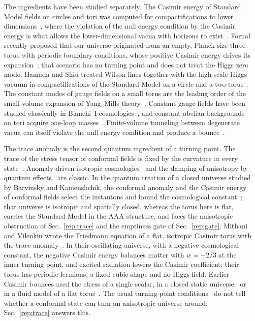 The ingredients have been studied separately.
The Casimir energy of Standard Model fields on circles and tori was computed for compactifications to lower dimensions~\cite{Arkani-Hamed:2007ryu,Fornal:2011tw}, where the violation of the null energy condition by the Casimir energy is what allows the lower-dimensional vacua with horizons to exist~\cite{Arkani-Hamed:2007ryu}.
Fornal recently proposed that our universe originated from an empty, Planck-size three-torus with periodic boundary conditions, whose positive Casimir energy drives its expansion~\cite{Fornal:2026qfq}; that scenario has no turning point and does not treat the Higgs zero mode.
Hamada and Shiu treated Wilson lines together with the high-scale Higgs vacuum in compactifications of the Standard Model on a circle and a two-torus~\cite{Hamada:2017yji}.
The constant modes of gauge fields on a small torus are the leading order of the small-volume expansion of Yang--Mills theory~\cite{Luscher:1982uv,Luscher:1982ma,Luscher:1983gm,Weisz:1986vu,vanBaal:1988va,vanBaal:2000zc}.
Constant gauge fields have been studied classically in Bianchi~I cosmologies~\cite{Darian:1996jf,Jin:2004vh}, and constant abelian backgrounds on tori acquire one-loop masses~\cite{Kirsten:1993ty,Kirsten:1993qp}.
Finite-volume tunneling between degenerate vacua can itself violate the null energy condition and produce a bounce~\cite{Alexandre:2019ygz,Ai:2024dwi}.

The trace anomaly is the second quantum ingredient of a turning point.
The trace of the stress tensor of conformal fields is fixed by the curvature in every state~\cite{Duff:1993wm}.
Anomaly-driven isotropic cosmologies~\cite{Starobinsky:1980te,Fischetti:1979ue} and the damping of anisotropy by quantum effects~\cite{Hu:1978zd,Hartle:1979uf,Hartle:1980nn} are classic.
In the quantum creation of a closed universe studied by Barvinsky and Kamenshchik, the conformal anomaly and the Casimir energy of conformal fields select the instantons and bound the cosmological constant~\cite{Barvinsky:2006uh}; that universe is isotropic and spatially closed, whereas the torus here is flat, carries the Standard Model in the AAA structure, and faces the anisotropic obstruction of Sec.~\ref{rep:trace} and the emptiness gate of Sec.~\ref{rep:gate}.
Mithani and Vilenkin wrote the Friedmann equation of a flat, isotropic Casimir torus with the trace anomaly~\cite{Mithani:2014toa}.
In their oscillating universe, with a negative cosmological constant, the negative Casimir energy balances matter with $w=-2/3$ at the inner turning point, and excited radiation lowers the Casimir coefficient; their torus has periodic fermions, a fixed cubic shape and no Higgs field.
Earlier Casimir bounces used the stress of a single scalar, in a closed static universe~\cite{Herdeiro:2005zj} or in a fluid model of a flat torus~\cite{Godlowski:2007gx}.
The usual turning-point conditions~\cite{Solomons:2001ef} do not tell whether a conformal state can turn an anisotropic universe around; Sec.~\ref{rep:trace} answers this.

